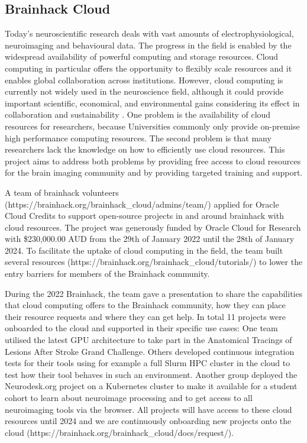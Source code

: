 \documentclass[../main.tex]{subfiles}
\begin{document}
\subsection{Brainhack Cloud}


Today’s neuroscientific research deals with vast amounts of electrophysiological, neuroimaging and behavioural data. The progress in the field is enabled by the widespread availability of powerful computing and storage resources. Cloud computing in particular offers the opportunity to flexibly scale resources and it enables global collaboration across institutions. However, cloud computing is currently not widely used in the neuroscience field, although it could provide important scientific, economical, and environmental gains considering its effect in collaboration and sustainability \citep{apon2015, OracleSustainabilty}. One problem is the availability of cloud resources for researchers, because Universities commonly only provide on-premise high performance computing resources. The second problem is that many researchers lack the knowledge on how to efficiently use cloud resources. This project aims to address both problems by providing free access to cloud resources for the brain imaging community and by providing targeted training and support.

A team of brainhack volunteers (https://brainhack.org/brainhack\_cloud/admins/team/) applied for Oracle Cloud Credits to support open-source projects in and around brainhack with cloud resources. The project was generously funded by Oracle Cloud for Research \citep{OracleResearch} with \$230,000.00 AUD from the 29th of January 2022 until the 28th of January 2024. To facilitate the uptake of cloud computing in the field, the team built several resources (https://brainhack.org/brainhack\_cloud/tutorials/) to lower the entry barriers for members of the Brainhack community. 

During the 2022 Brainhack, the team gave a presentation to share the capabilities that cloud computing offers to the Brainhack community, how they can place their resource requests and where they can get help. In total 11 projects were onboarded to the cloud and supported in their specific use cases: One team utilised the latest GPU architecture to take part in the Anatomical Tracings of Lesions After Stroke Grand Challenge. Others developed continuous integration tests for their tools using for example a full Slurm HPC cluster in the cloud to test how their tool behaves in such an environment. Another group deployed the Neurodesk.org \citep{NeuroDesk} project on a Kubernetes cluster to make it available for a student cohort to learn about neuroimage processing and to get access to all neuroimaging tools via the browser. All projects will have access to these cloud resources until 2024 and we are continuously onboarding new projects onto the cloud (https://brainhack.org/brainhack\_cloud/docs/request/).
\end{document}
